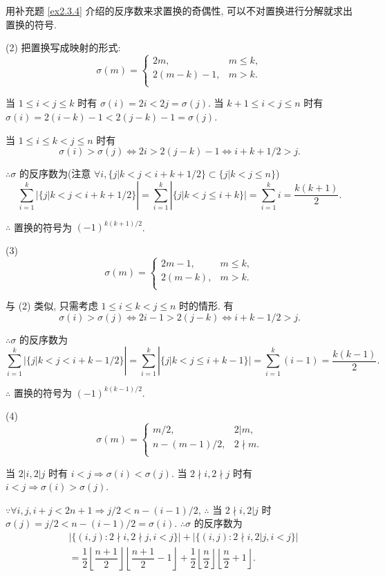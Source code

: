\documentclass[color=black,device=normal,lang=cn,mode=geye]{elegantnote}
\begin{document}
\begin{solution}
    用补充题 \ref{ex2.3.4} 介绍的反序数来求置换的奇偶性, 可以不对置换进行分解就求出置换的符号.

    (2) 把置换写成映射的形式:
    \[\sigma(m)=\begin{cases}
        2m, & m\leq k, \\
        2(m-k)-1, & m>k. \\
    \end{cases}\]

    当 $1\leq i<j\leq k$ 时有 $\sigma(i)=2i<2j=\sigma(j)$. 当 $k+1\leq i<j\leq n$ 时有 $\sigma(i)=2(i-k)-1<2(j-k)-1=\sigma(j)$.

    当 $1\leq i\leq k<j\leq n$ 时有
    \[\sigma(i)>\sigma(j)\Leftrightarrow2i>2(j-k)-1\Leftrightarrow i+k+1/2>j.\]

    $\therefore\sigma$ 的反序数为(注意 $\forall i,\{j|k<j<i+k+1/2\}\subset\{j|k<j\leq n\}$)
    \[\sum\limits_{i=1}^k|\{j|k<j<i+k+1/2\}|=\sum\limits_{i=1}^k|\{j|k<j\leq i+k\}|=\sum\limits_{i=1}^ki=\dfrac{k(k+1)}{2}.\]

    $\therefore$ 置换的符号为 $(-1)^{k(k+1)/2}$.

    (3)
    \[\sigma(m)=\begin{cases}
        2m-1, & m\leq k, \\
        2(m-k), & m>k. \\
    \end{cases}\]

    与 (2) 类似, 只需考虑 $1\leq i\leq k<j\leq n$ 时的情形. 有
    \[\sigma(i)>\sigma(j)\Leftrightarrow2i-1>2(j-k)\Leftrightarrow i+k-1/2>j.\]

    $\therefore\sigma$ 的反序数为
    \[\sum\limits_{i=1}^k|\{j|k<j<i+k-1/2\}|=\sum\limits_{i=1}^k|\{j|k<j\leq i+k-1\}|=\sum\limits_{i=1}^k(i-1)=\dfrac{k(k-1)}{2}.\]

    $\therefore$ 置换的符号为 $(-1)^{k(k-1)/2}$.

    (4)
    \[\sigma(m)=\begin{cases}
        m/2, & 2|m, \\
        n-(m-1)/2, & 2\nmid m. \\
    \end{cases}\]
    
    当 $2|i,2|j$ 时有 $i<j\Rightarrow\sigma(i)<\sigma(j)$. 当 $2\nmid i,2\nmid j$ 时有 $i<j\Rightarrow\sigma(i)>\sigma(j)$.

    $\because\forall i,j,i+j<2n+1\Rightarrow j/2<n-(i-1)/2$, $\therefore$ 当 $2\nmid i,2|j$ 时 $\sigma(j)=j/2<n-(i-1)/2=\sigma(i)$. $\therefore\sigma$ 的反序数为
    \begin{align*}
        & |\{(i,j):2\nmid i,2\nmid j,i<j\}|+|\{(i,j):2\nmid i,2|j,i<j\}| \\
        & =\dfrac{1}{2}\left\lfloor\dfrac{n+1}{2}\right\rfloor\left\lfloor\dfrac{n+1}{2}-1\right\rfloor+\dfrac{1}{2}\left\lfloor\dfrac{n}{2}\right\rfloor\left\lfloor\dfrac{n}{2}+1\right\rfloor. \\
    \end{align*}


\end{solution}
\end{document}
